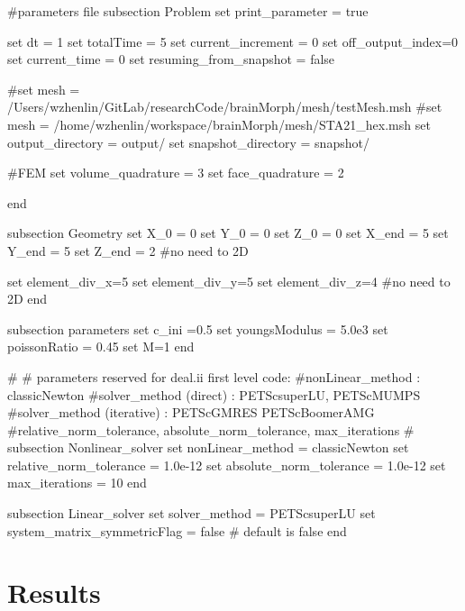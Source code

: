 \begin{DoxyCode}
\textcolor{preprocessor}{#parameters file}
\textcolor{preprocessor}{}
subsection Problem
set print\_parameter = \textcolor{keyword}{true}

set dt = 1
set totalTime = 5
set current\_increment = 0
set off\_output\_index=0
set current\_time = 0
set resuming\_from\_snapshot = \textcolor{keyword}{false}

\textcolor{preprocessor}{#set mesh = /Users/wzhenlin/GitLab/researchCode/brainMorph/mesh/testMesh.msh}
\textcolor{preprocessor}{}\textcolor{preprocessor}{#set mesh = /home/wzhenlin/workspace/brainMorph/mesh/STA21\_hex.msh}
\textcolor{preprocessor}{}set output\_directory = output/
set snapshot\_directory = snapshot/

\textcolor{preprocessor}{#FEM}
\textcolor{preprocessor}{}set volume\_quadrature = 3 
set face\_quadrature = 2 

end

subsection Geometry
set X\_0 = 0
set Y\_0 = 0
set Z\_0 = 0
set X\_end = 5 
set Y\_end = 5
set Z\_end = 2 #no need to 2D

set element\_div\_x=5
set element\_div\_y=5
set element\_div\_z=4 #no need to 2D
end

subsection parameters
set c\_ini =0.5
set youngsModulus =  5.0e3
set poissonRatio =  0.45
set M=1 
end
                        
\textcolor{preprocessor}{#}
\textcolor{preprocessor}{}\textcolor{preprocessor}{# parameters reserved for deal.ii first level code:}
\textcolor{preprocessor}{}\textcolor{preprocessor}{#nonLinear\_method : classicNewton}
\textcolor{preprocessor}{}\textcolor{preprocessor}{#solver\_method (direct) : PETScsuperLU, PETScMUMPS}
\textcolor{preprocessor}{}\textcolor{preprocessor}{#solver\_method (iterative) : PETScGMRES PETScBoomerAMG}
\textcolor{preprocessor}{}\textcolor{preprocessor}{#relative\_norm\_tolerance, absolute\_norm\_tolerance, max\_iterations}
\textcolor{preprocessor}{}\textcolor{preprocessor}{#}
\textcolor{preprocessor}{}subsection Nonlinear\_solver
        set nonLinear\_method = classicNewton
        set relative\_norm\_tolerance = 1.0e-12
        set absolute\_norm\_tolerance = 1.0e-12
        set max\_iterations = 10
end
                        
subsection Linear\_solver
        set solver\_method = PETScsuperLU
        set system\_matrix\_symmetricFlag = \textcolor{keyword}{false} # \textcolor{keywordflow}{default} is \textcolor{keyword}{false}
end
\end{DoxyCode}
 \hypertarget{growth_results}{}\section{Results}\label{growth_results}
  
